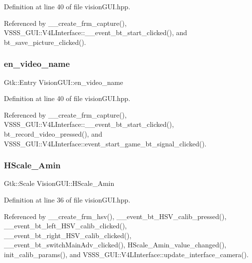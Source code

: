 Definition at line 40 of file vision\+G\+U\+I.\+hpp.



Referenced by \+\_\+\+\_\+create\+\_\+frm\+\_\+capture(), V\+S\+S\+S\+\_\+\+G\+U\+I\+::\+V4\+L\+Interface\+::\+\_\+\+\_\+event\+\_\+bt\+\_\+start\+\_\+clicked(), and bt\+\_\+save\+\_\+picture\+\_\+clicked().

\mbox{\label{class_vision_g_u_i_ab09e0f327e58a9d8e10ae343037a3ce2}} 
\subsubsection{\texorpdfstring{en\+\_\+video\+\_\+name}{en\_video\_name}}
{\footnotesize\ttfamily Gtk\+::\+Entry Vision\+G\+U\+I\+::en\+\_\+video\+\_\+name}



Definition at line 40 of file vision\+G\+U\+I.\+hpp.



Referenced by \+\_\+\+\_\+create\+\_\+frm\+\_\+capture(), V\+S\+S\+S\+\_\+\+G\+U\+I\+::\+V4\+L\+Interface\+::\+\_\+\+\_\+event\+\_\+bt\+\_\+start\+\_\+clicked(), bt\+\_\+record\+\_\+video\+\_\+pressed(), and V\+S\+S\+S\+\_\+\+G\+U\+I\+::\+V4\+L\+Interface\+::event\+\_\+start\+\_\+game\+\_\+bt\+\_\+signal\+\_\+clicked().

\mbox{\label{class_vision_g_u_i_a72d3a4fe84821ceafeb4293f196aacd7}} 
\subsubsection{\texorpdfstring{H\+Scale\+\_\+\+Amin}{HScale\_Amin}}
{\footnotesize\ttfamily Gtk\+::\+Scale Vision\+G\+U\+I\+::\+H\+Scale\+\_\+\+Amin}



Definition at line 36 of file vision\+G\+U\+I.\+hpp.



Referenced by \+\_\+\+\_\+create\+\_\+frm\+\_\+hsv(), \+\_\+\+\_\+event\+\_\+bt\+\_\+\+H\+S\+V\+\_\+calib\+\_\+pressed(), \+\_\+\+\_\+event\+\_\+bt\+\_\+left\+\_\+\+H\+S\+V\+\_\+calib\+\_\+clicked(), \+\_\+\+\_\+event\+\_\+bt\+\_\+right\+\_\+\+H\+S\+V\+\_\+calib\+\_\+clicked(), \+\_\+\+\_\+event\+\_\+bt\+\_\+switch\+Main\+Adv\+\_\+clicked(), H\+Scale\+\_\+\+Amin\+\_\+value\+\_\+changed(), init\+\_\+calib\+\_\+params(), and V\+S\+S\+S\+\_\+\+G\+U\+I\+::\+V4\+L\+Interface\+::update\+\_\+interface\+\_\+camera().

